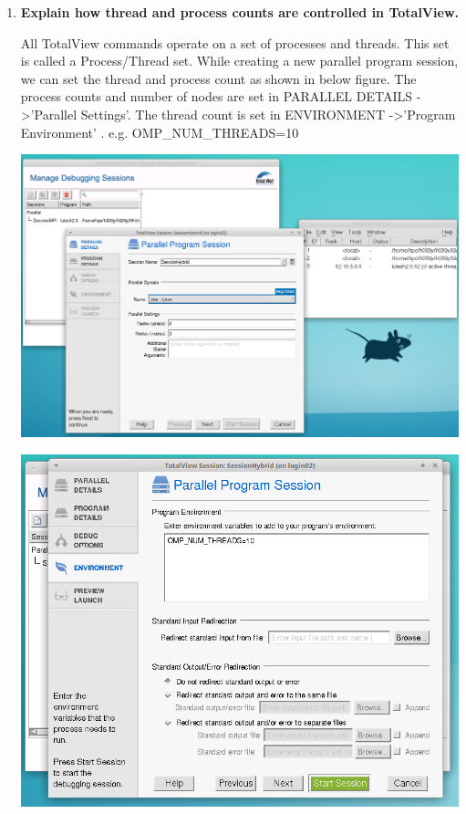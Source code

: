 \documentclass[10pt, letterpaper, twoside]{article}
\begin{document}
\begin{titlepage}
\begin{enumerate}
\item \textbf{Explain how thread and process counts are controlled in TotalView.}

All TotalView commands operate on a set of processes and threads. This set is called a Process/Thread set. While creating a new parallel program session, we can set the thread and process count as shown in below figure. The process counts and number of nodes are set in PARALLEL DETAILS -\textgreater  'Parallel Settings'. The thread count is set in ENVIRONMENT -\textgreater  'Program Environment' . e.g. OMP\_NUM\_THREADS=10 

\hspace{18mm}
\includegraphics[scale = 0.3]{Hybrid1.png}
\vspace{5mm}

\hspace{25mm}
\includegraphics[scale = 0.5]{Hybrid2.png} 
\vspace{5mm}



\end{enumerate}
\end{titlepage}
\end{document}
